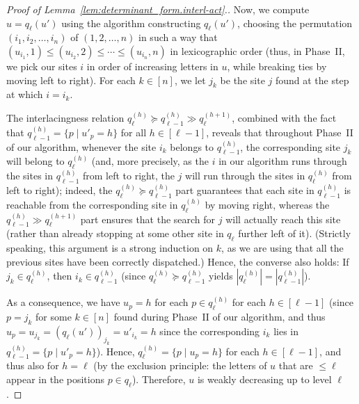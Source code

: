 \documentclass[reqno]{amsart}
\newcommand{\0}{\phantom{c}}
\newenvironment{verlong}{}{}
\newcommand{\abs}[1]{\left| #1 \right|}
\newcommand{\tup}[1]{\left( #1 \right)}
\newcommand{\ive}[1]{\left[ #1 \right]}
\theoremstyle{plain}
\theoremstyle{definition}
\numberwithin{equation}{section}
\begin{document}
\begin{proof}[Proof of Lemma~\ref{lem:determinant_form.interl-act}.]
\begin{verlong}
Now, we compute $u = q_{\ell} (u')$ using the algorithm constructing $q_{\ell} (u')$,
choosing the permutation
$\tup{i_1, i_2, \ldots, i_n}$ of $\tup{1, 2, \ldots, n}$
in such a way that $(u_{i_1}, 1) \leq (u_{i_2}, 2) \leq \cdots \leq (u_{i_n}, n)$
in lexicographic order
(thus, in Phase~II, we pick our sites $i$ in order of increasing letters in $u$,
while breaking ties by moving left to right).
For each $k \in \ive{n}$, we let $j_k$ be the site $j$ found at the step at which $i = i_k$.

The interlacingness relation $q_{\ell}^{(h)} \succeq q_{\ell-1}^{(h)} \gg q_{\ell}^{(h+1)}$,
combined with the fact that $q_{\ell-1}^{(h)} = \{p \mid u'_p = h\}$ for all $h \in \ive{\ell-1}$,
reveals that throughout Phase~II of our algorithm,
whenever the site $i_k$ belongs to $q_{\ell-1}^{(h)}$,
the corresponding site $j_k$ will belong to $q_{\ell}^{(h)}$
(and, more precisely, as the $i$ in our algorithm runs through the
sites in $q_{\ell-1}^{(h)}$ from left to right,
the $j$ will run through the sites in $q_{\ell}^{(h)}$ from left to right);
indeed, the $q_{\ell}^{(h)} \succeq q_{\ell-1}^{(h)}$ part guarantees that
each site in $q_{\ell-1}^{(h)}$ is reachable from the corresponding
site in $q_{\ell}^{(h)}$ by moving right, whereas the
$q_{\ell-1}^{(h)} \gg q_{\ell}^{(h+1)}$ part ensures that the search for $j$
will actually reach this site
(rather than already stopping at some other site in $q_{\ell}$ further left of it).
(Strictly speaking, this argument is a strong induction on $k$, as we are
using that all the previous sites have been correctly dispatched.)
Hence, the converse also holds:
If $j_k \in q_{\ell}^{(h)}$, then $i_k \in q_{\ell-1}^{(h)}$
(since $q_{\ell}^{(h)} \succeq q_{\ell-1}^{(h)}$ yields
$\abs{q_{\ell}^{(h)}} = \abs{q_{\ell-1}^{(h)}}$).

As a consequence, we have $u_p = h$ for each $p \in q_{\ell}^{(h)}$ for each $h \in \ive{\ell-1}$
(since $p = j_k$ for some $k \in \ive{n}$ found during Phase~II of our
algorithm, and thus
$u_p = u_{j_k} = ( q_{\ell}(u') )_{j_k} = u'_{i_k} = h$ since the corresponding
$i_k$ lies in $q_{\ell-1}^{(h)} = \{p \mid u'_p = h\}$).
Hence, $q_{\ell}^{(h)} = \{p \mid u_p = h\}$ for each $h \in \ive{\ell-1}$, and thus also for $h = \ell$
(by the exclusion principle: the letters of $u$ that are $\leq \ell$ appear in the positions $p \in q_{\ell}$).
Therefore, $u$ is weakly decreasing up to level $\ell$.
\end{verlong}
\end{proof}
\end{document}

